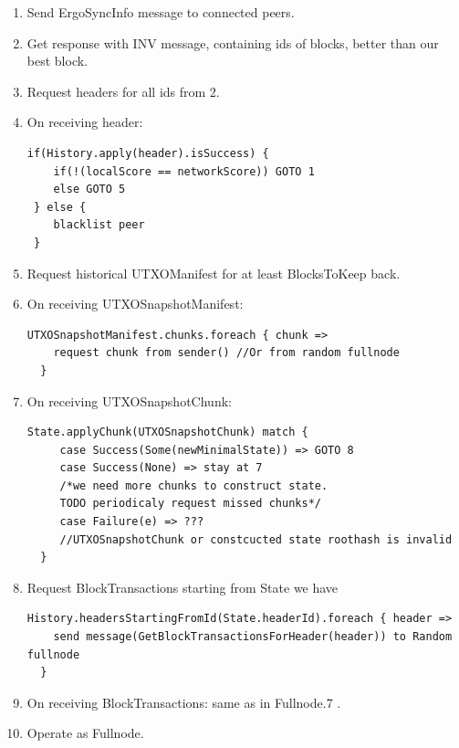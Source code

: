 \documentclass[]{article}   %
\begin{document}
\begin{enumerate}
\item Send ErgoSyncInfo message to connected peers.
\item Get response with INV message, containing ids of blocks, better than our best block.
\item Request headers for all ids from 2.
\item On receiving header:
\begin{verbatim}
if(History.apply(header).isSuccess) {
    if(!(localScore == networkScore)) GOTO 1
    else GOTO 5
 } else {
    blacklist peer
 }
\end{verbatim}

\item Request historical UTXOManifest for at least BlocksToKeep back.

\item On receiving UTXOSnapshotManifest:

\begin{verbatim}
UTXOSnapshotManifest.chunks.foreach { chunk =>
    request chunk from sender() //Or from random fullnode
  }
\end{verbatim}
\item On receiving UTXOSnapshotChunk:
\begin{verbatim}
State.applyChunk(UTXOSnapshotChunk) match {
     case Success(Some(newMinimalState)) => GOTO 8
     case Success(None) => stay at 7
     /*we need more chunks to construct state.
     TODO periodicaly request missed chunks*/
     case Failure(e) => ???
     //UTXOSnapshotChunk or constcucted state roothash is invalid
  }
\end{verbatim}

\item Request BlockTransactions starting from State we have
\begin{verbatim}
History.headersStartingFromId(State.headerId).foreach { header =>
    send message(GetBlockTransactionsForHeader(header)) to Random fullnode
  }
\end{verbatim}
\item On receiving BlockTransactions: same as in Fullnode.7 .
\item Operate as Fullnode.


\end{enumerate}
\end{document}
